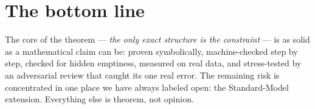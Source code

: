 \documentclass[11pt]{article}
\begin{document}
\section*{The bottom line}

The core of the theorem --- \emph{the only exact structure is the constraint} --- is as
solid as a mathematical claim can be: proven symbolically, machine-checked step by step,
checked for hidden emptiness, measured on real data, and stress-tested by an adversarial
review that caught its one real error. The remaining risk is concentrated in one place we
have always labeled open: the Standard-Model extension. Everything else is theorem, not
opinion.
\end{document}
